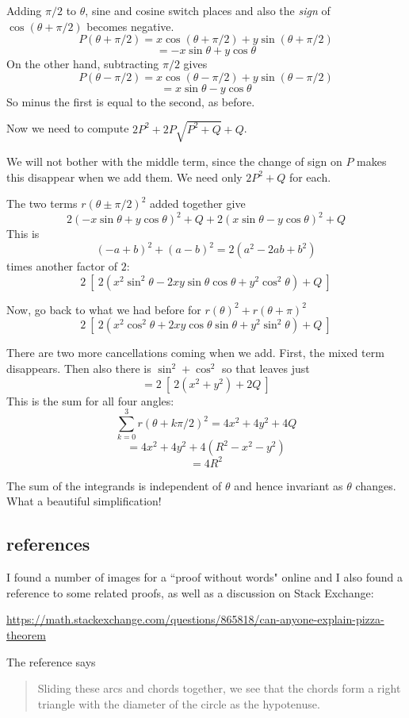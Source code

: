 \documentclass[11pt, oneside]{article}
\begin{document}
Adding $\pi/2$ to $\theta$, sine and cosine switch places and also the \emph{sign} of $\cos(\theta + \pi/2)$ becomes negative.
\[ P(\theta + \pi/2) = x \cos (\theta + \pi/2) + y \sin (\theta + \pi/2) \] 
\[ = - x \sin \theta + y \cos \theta \]
On the other hand, subtracting $\pi/2$ gives
\[ P(\theta - \pi/2) = x \cos (\theta - \pi/2) + y \sin (\theta - \pi/2) \] 
\[ = x \sin \theta - y \cos \theta \]
So minus the first is equal to the second, as before.

Now we need to compute $2P^2 + 2P \sqrt{P^2 + Q} + Q$.  

We will not bother with the middle term, since the change of sign on $P$ makes this disappear when we add them.  We need only $2P^2 + Q$ for each.

The two terms $r(\theta \pm \pi/2)^2$ added together give
\[ 2 (- x \sin \theta + y \cos \theta)^2 + Q + 2 (x \sin \theta - y \cos \theta)^2 + Q \]
This is 
\[ (-a + b)^2 + (a - b)^2 = 2(a^2 - 2ab + b^2) \]
 times another factor of $2$:
\[ 2 \ [ \ 2(x^2 \sin^2 \theta - 2xy \sin \theta \cos \theta + y^2 \cos^2 \theta) + Q \ ]  \]

Now, go back to what we had before for $r(\theta)^2 + r(\theta + \pi)^2$
\[ 2 \ [ \ 2(x^2 \cos^2 \theta + 2xy \cos \theta \sin \theta + y^2 \sin^2 \theta) + Q \ ] \]

There are two more cancellations coming when we add.  First, the mixed term disappears.  Then also there is $\sin^2 + \cos^2$ so that leaves just
\[ = 2 \  [ \ 2(x^2 + y^2) + 2Q \ ] \]
This is the sum for all four angles:
\[ \sum_{k=0}^3 r(\theta + k \pi/2)^2 = 4x^2 + 4y^2 + 4Q \]
\[ = 4x^2 + 4y^2 + 4(R^2 - x^2 - y^2) \]
\[ = 4 R^2 \]

The sum of the integrands is independent of $\theta$ and hence invariant as $\theta$ changes.  What a beautiful simplification!

\subsection*{references}

I found a number of images for a ``proof without words" online and I also found a reference to some related proofs, as well as a discussion on Stack Exchange:

\url{https://math.stackexchange.com/questions/865818/can-anyone-explain-pizza-theorem}

The reference says

\begin{quote}Sliding these arcs and
chords together, we see that the chords form a right triangle with the
diameter of the circle as the hypotenuse.\end{quote}
\end{document}
